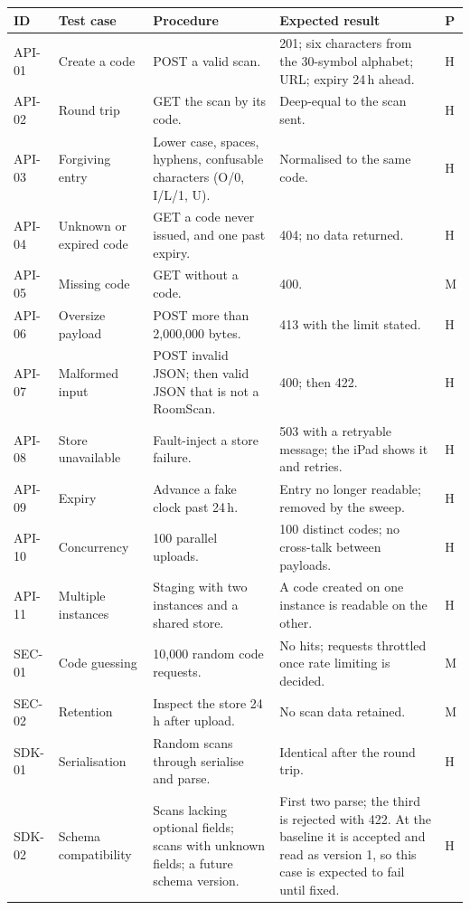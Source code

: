 \documentclass[conference,a4paper,10pt]{IEEEtran}
\begin{document}
\begin{longtable}{@{}L{1.25cm}L{3.6cm}L{5.4cm}L{5.1cm}C{0.4cm}@{}}
\toprule
ID & Test case & Procedure & Expected result & P \\
\midrule
\endhead
\bottomrule
\endfoot
API-01 & Create a code & POST a valid scan. & 201; six characters from the 30-symbol alphabet; URL; expiry 24\,h ahead. & H \\
API-02 & Round trip & GET the scan by its code. & Deep-equal to the scan sent. & H \\
API-03 & Forgiving entry & Lower case, spaces, hyphens, confusable characters (O/0, I/L/1, U). & Normalised to the same code. & H \\
API-04 & Unknown or expired code & GET a code never issued, and one past expiry. & 404; no data returned. & H \\
API-05 & Missing code & GET without a code. & 400. & M \\
API-06 & Oversize payload & POST more than 2{,}000{,}000 bytes. & 413 with the limit stated. & H \\
API-07 & Malformed input & POST invalid JSON; then valid JSON that is not a RoomScan. & 400; then 422. & H \\
API-08 & Store unavailable & Fault-inject a store failure. & 503 with a retryable message; the iPad shows it and retries. & H \\
API-09 & Expiry & Advance a fake clock past 24\,h. & Entry no longer readable; removed by the sweep. & H \\
API-10 & Concurrency & 100 parallel uploads. & 100 distinct codes; no cross-talk between payloads. & H \\
API-11 & Multiple instances & Staging with two instances and a shared store. & A code created on one instance is readable on the other. & H \\
SEC-01 & Code guessing & 10{,}000 random code requests. & No hits; requests throttled once rate limiting is decided. & M \\
SEC-02 & Retention & Inspect the store 24\,h after upload. & No scan data retained. & M \\
SDK-01 & Serialisation & Random scans through serialise and parse. & Identical after the round trip. & H \\
SDK-02 & Schema compatibility & Scans lacking optional fields; scans with unknown fields; a future schema version. & First two parse; the third is rejected with 422. At the baseline it is accepted and read as version 1, so this case is expected to fail until fixed. & H \\

\end{longtable}
\end{document}
